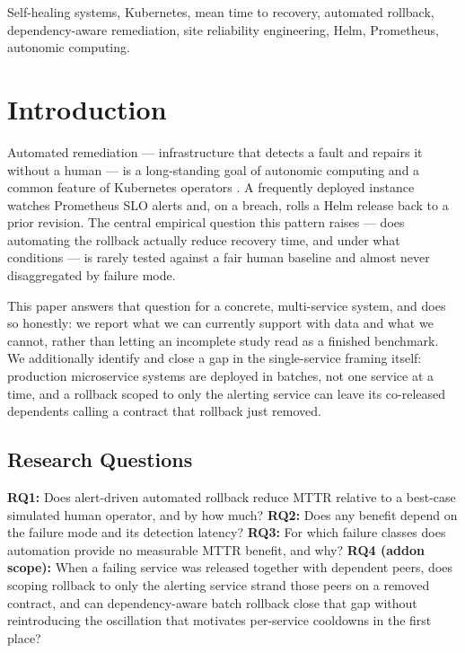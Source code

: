 \documentclass[conference]{IEEEtran}
\begin{document}
\begin{IEEEkeywords}
Self-healing systems, Kubernetes, mean time to recovery, automated rollback, dependency-aware remediation, site reliability engineering, Helm, Prometheus, autonomic computing.
\end{IEEEkeywords}

\section{Introduction}
Automated remediation --- infrastructure that detects a fault and repairs it without a human --- is a long-standing goal of autonomic computing \cite{kephart2003vision,ibm2006blueprint} and a common feature of Kubernetes operators \cite{burns2016borg,dobies2020operators}. A frequently deployed instance watches Prometheus SLO alerts \cite{brazil2018prometheus} and, on a breach, rolls a Helm release back to a prior revision. The central empirical question this pattern raises --- does automating the rollback actually reduce recovery time, and under what conditions --- is rarely tested against a fair human baseline and almost never disaggregated by failure mode.

This paper answers that question for a concrete, multi-service system, and does so honestly: we report what we can currently support with data and what we cannot, rather than letting an incomplete study read as a finished benchmark. We additionally identify and close a gap in the single-service framing itself: production microservice systems are deployed in batches, not one service at a time, and a rollback scoped to only the alerting service can leave its co-released dependents calling a contract that rollback just removed.

\subsection{Research Questions}
\textbf{RQ1:} Does alert-driven automated rollback reduce MTTR relative to a best-case simulated human operator, and by how much? \textbf{RQ2:} Does any benefit depend on the failure mode and its detection latency? \textbf{RQ3:} For which failure classes does automation provide no measurable MTTR benefit, and why? \textbf{RQ4 (addon scope):} When a failing service was released together with dependent peers, does scoping rollback to only the alerting service strand those peers on a removed contract, and can dependency-aware batch rollback close that gap without reintroducing the oscillation that motivates per-service cooldowns in the first place?
\end{document}
